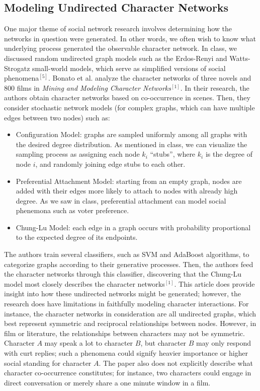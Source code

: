 \documentclass{article}
\begin{document}
\subsection{Modeling Undirected Character Networks}
One major theme of social network research involves determining how the networks in question were generated. In other words, we often wish to know what underlying process generated the observable character network. In class, we discussed random undirected graph models such as the Erdos-Renyi and Watts-Strogatz small-world models, which serve as simplified versions of social phenomena$^{[5]}$. 
\newline\newline
Bonato et al. analyze the character networks of three novels and 800 films in \textit{Mining and Modeling Character Networks}$^{[1]}$. In their research, the authors obtain character networks based on co-occurrence in scenes. Then, they consider stochastic network models (for complex graphs, which can have multiple edges between two nodes) such as:
\begin{itemize}
	\item Configuration Model: graphs are sampled uniformly among all graphs with the desired degree distribution. As mentioned in class, we can visualize the sampling process as assigning each node $k_i$ ``stubs'', where $k_i$ is the degree of node $i$, and randomly joining edge stubs to each other.
	\item Preferential Attachment Model: starting from an empty graph, nodes are added with their edges more likely to attach to nodes with already high degree. As we saw in class, preferential attachment can model social phenemona such as voter preference.
	\item Chung-Lu Model: each edge in a graph occurs with probability proportional to the expected degree of its endpoints.
\end{itemize}
The authors train several classifiers, such as SVM and AdaBoost algorithms, to categorize graphs according to their generative processes. Then, the authors feed the character networks through this classifier, discovering that the Chung-Lu model most closely describes the character networks$^{[1]}$.
\newline\newline
This article does provide insight into how these undirected networks might be generated; however, the research does have limitations in faithfully modeling character interactions. For instance, the character networks in consideration are all undirected graphs, which best represent symmetric and reciprocal relationships between nodes. However, in film or literature, the relationships between characters may not be symmetric. Character $A$ may speak a lot to character $B$, but character $B$ may only respond with curt replies; such a phenomena could signify heavier importance or higher social standing for character $A$. The paper also does not explicitly describe what character co-occurrence constitutes; for instance, two characters could engage in direct conversation or merely share a one minute window in a film.
\end{document}
